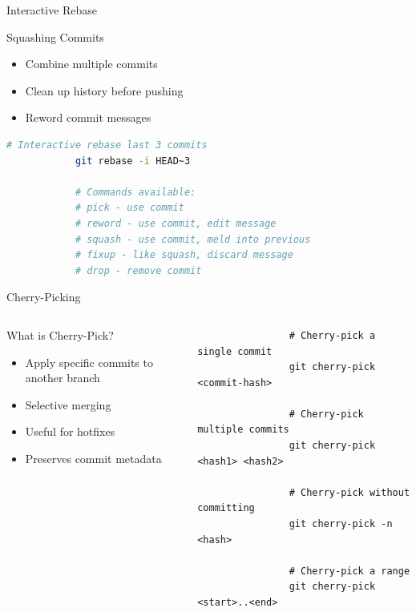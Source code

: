 \documentclass[aspectratio=169]{beamer}
\begin{document}
	\begin{frame}[fragile]{Interactive Rebase}
		\begin{block}{Squashing Commits}
			\begin{itemize}
				\item Combine multiple commits
				\item Clean up history before pushing
				\item Reword commit messages
			\end{itemize}
		\end{block}
		
		\begin{lstlisting}[language=bash]
			# Interactive rebase last 3 commits
			git rebase -i HEAD~3
			
			# Commands available:
			# pick - use commit
			# reword - use commit, edit message
			# squash - use commit, meld into previous
			# fixup - like squash, discard message
			# drop - remove commit
		\end{lstlisting}
	\end{frame}
	
	\begin{frame}{Cherry-Picking}
		\begin{columns}
			\begin{block}{What is Cherry-Pick?}
				\begin{itemize}
					\item Apply specific commits to another branch
					\item Selective merging
					\item Useful for hotfixes
					\item Preserves commit metadata
				\end{itemize}
			\end{block}
			
			\begin{verbatim}
				# Cherry-pick a single commit
				git cherry-pick <commit-hash>
				
				# Cherry-pick multiple commits
				git cherry-pick <hash1> <hash2>
				
				# Cherry-pick without committing
				git cherry-pick -n <hash>
				
				# Cherry-pick a range
				git cherry-pick <start>..<end>
			\end{verbatim}
		\end{columns}
	\end{frame}
	
\end{document}
